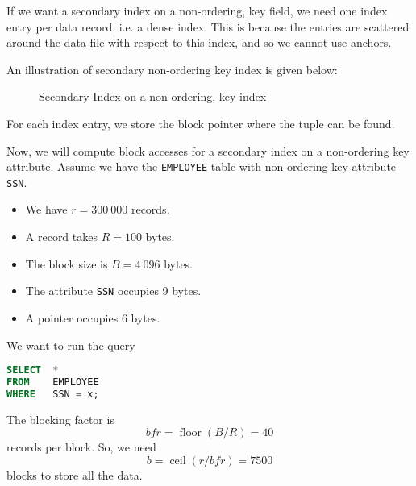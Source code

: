\documentclass[a4paper, openany]{memoir}
\begin{document}
If we want a secondary index on a non-ordering, key field, we need one index entry per data record, i.e. a dense index. This is because the entries are scattered around the data file with respect to this index, and so we cannot use anchors.

An illustration of secondary non-ordering key index is given below:
\begin{figure}[H]
    \centering
    \caption{Secondary Index on a non-ordering, key index}
\end{figure}
\noindent For each index entry, we store the block pointer where the tuple can be found.

Now, we will compute block accesses for a secondary index on a non-ordering key attribute. Assume we have the \texttt{EMPLOYEE} table with non-ordering key attribute \texttt{SSN}. 
\begin{itemize}
    \item We have $r = 300 \ 000$ records.
    \item A record takes $R = 100$ bytes.
    \item The block size is $B = 4 \ 096$ bytes.
    \item The attribute \texttt{SSN} occupies 9 bytes.
    \item A pointer occupies 6 bytes.
\end{itemize}
We want to run the query
\begin{lstlisting}[language=SQL]
SELECT  *
FROM    EMPLOYEE
WHERE   SSN = x;
\end{lstlisting}
The blocking factor is
\[\textit{bfr} = \operatorname{floor}(B/R) = 40\]
records per block. So, we need
\[b = \operatorname{ceil}(r/\textit{bfr}) = 7500\]
blocks to store all the data.
\end{document}
